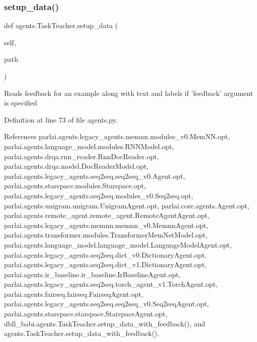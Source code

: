 \subsubsection{\texorpdfstring{setup\+\_\+data()}{setup\_data()}}
{\footnotesize\ttfamily def agents.\+Task\+Teacher.\+setup\+\_\+data (\begin{DoxyParamCaption}\item[{}]{self,  }\item[{}]{path }\end{DoxyParamCaption})}

\begin{DoxyVerb}Reads feedback for an example along with text and labels
if 'feedback' argument is specified
\end{DoxyVerb}
 

Definition at line 73 of file agents.\+py.



References parlai.\+agents.\+legacy\+\_\+agents.\+memnn.\+modules\+\_\+v0.\+Mem\+N\+N.\+opt, parlai.\+agents.\+language\+\_\+model.\+modules.\+R\+N\+N\+Model.\+opt, parlai.\+agents.\+drqa.\+rnn\+\_\+reader.\+Rnn\+Doc\+Reader.\+opt, parlai.\+agents.\+drqa.\+model.\+Doc\+Reader\+Model.\+opt, parlai.\+agents.\+legacy\+\_\+agents.\+seq2seq.\+seq2seq\+\_\+v0.\+Agent.\+opt, parlai.\+agents.\+starspace.\+modules.\+Starspace.\+opt, parlai.\+agents.\+legacy\+\_\+agents.\+seq2seq.\+modules\+\_\+v0.\+Seq2seq.\+opt, parlai.\+agents.\+unigram.\+unigram.\+Unigram\+Agent.\+opt, parlai.\+core.\+agents.\+Agent.\+opt, parlai.\+agents.\+remote\+\_\+agent.\+remote\+\_\+agent.\+Remote\+Agent\+Agent.\+opt, parlai.\+agents.\+legacy\+\_\+agents.\+memnn.\+memnn\+\_\+v0.\+Memnn\+Agent.\+opt, parlai.\+agents.\+transformer.\+modules.\+Transformer\+Mem\+Net\+Model.\+opt, parlai.\+agents.\+language\+\_\+model.\+language\+\_\+model.\+Language\+Model\+Agent.\+opt, parlai.\+agents.\+legacy\+\_\+agents.\+seq2seq.\+dict\+\_\+v0.\+Dictionary\+Agent.\+opt, parlai.\+agents.\+legacy\+\_\+agents.\+seq2seq.\+dict\+\_\+v1.\+Dictionary\+Agent.\+opt, parlai.\+agents.\+ir\+\_\+baseline.\+ir\+\_\+baseline.\+Ir\+Baseline\+Agent.\+opt, parlai.\+agents.\+legacy\+\_\+agents.\+seq2seq.\+torch\+\_\+agent\+\_\+v1.\+Torch\+Agent.\+opt, parlai.\+agents.\+fairseq.\+fairseq.\+Fairseq\+Agent.\+opt, parlai.\+agents.\+legacy\+\_\+agents.\+seq2seq.\+seq2seq\+\_\+v0.\+Seq2seq\+Agent.\+opt, parlai.\+agents.\+starspace.\+starspace.\+Starspace\+Agent.\+opt, dbll\+\_\+babi.\+agents.\+Task\+Teacher.\+setup\+\_\+data\+\_\+with\+\_\+feedback(), and agents.\+Task\+Teacher.\+setup\+\_\+data\+\_\+with\+\_\+feedback().

